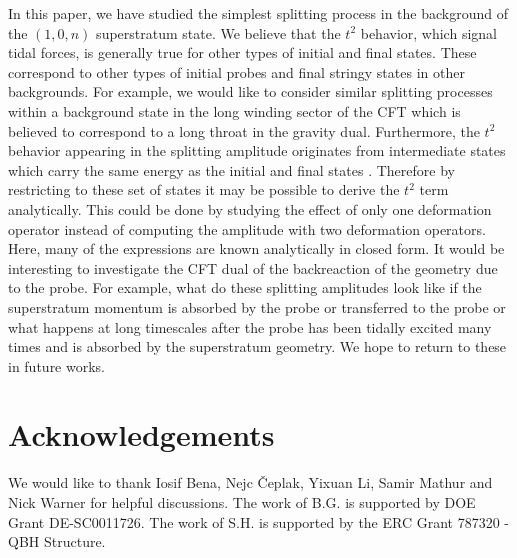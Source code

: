 \documentclass[11pt]{article}
\begin{document}
In this paper, we have studied the simplest splitting process in the background of the $(1,0,n)$ superstratum state. We believe that the $t^2$ behavior, which signal tidal forces, is generally true for other types of initial and final states. These correspond to other types of initial probes and final stringy states in other backgrounds. For example, we would like to consider similar splitting processes within a background state in the long winding sector of the CFT which is believed to correspond to a long throat in the gravity dual. Furthermore, the $t^2$ behavior appearing in the splitting amplitude originates from intermediate states which carry the same energy as the initial and final states \cite{hm}. Therefore by restricting to these set of states it may be possible to derive the $t^2$ term analytically.
This could be done by studying the effect of only one deformation operator instead of computing the amplitude with two deformation operators. Here, many of the expressions are known analytically in closed form. 
It would be interesting to investigate the CFT dual of the backreaction of the geometry due to the probe. For example, what do these splitting amplitudes look like if the superstratum momentum is absorbed by the probe or transferred to the probe or what happens at long timescales after the probe has been tidally excited many times and is absorbed by the superstratum geometry.  
We hope to return to these in future works.


\section{Acknowledgements}
We would like to thank Iosif Bena, Nejc Čeplak, Yixuan Li, Samir Mathur and Nick Warner for helpful discussions. The work of B.G. is supported by DOE Grant DE-SC0011726. The work of S.H. is supported by the ERC Grant 787320 - QBH Structure.
\end{document}
